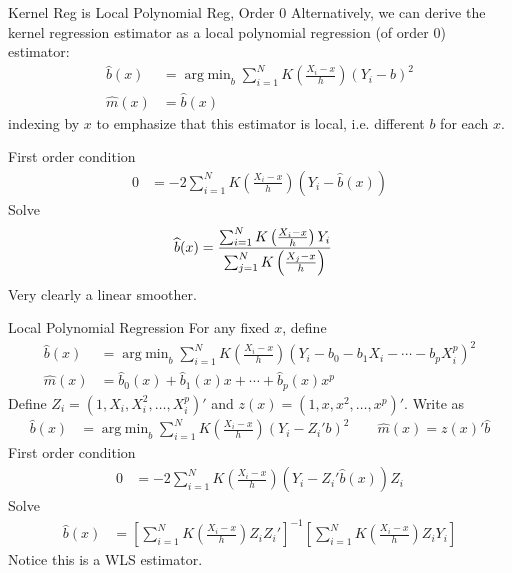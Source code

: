 \documentclass[aspectratio=169, handout]{beamer}
\DeclareMathOperator*{\argmin}{arg\;min}
\newcommand{\sumiN}{\sum^N_{i=1}}
\begin{document}
{\footnotesize
\begin{frame}{Kernel Reg is Local Polynomial Reg, Order 0}
Alternatively, we can derive the kernel regression estimator as a local
polynomial regression (of order 0) estimator:
\begin{align*}
  \widehat{b}(x)
  &=
  \argmin_b
  \sumiN
  K\left(
  \frac{X_i-x}{h}
  \right)
  (Y_i-b)^2
  \\
  \widehat{m}(x)
  &=
  \widehat{b}(x)
\end{align*}
indexing by $x$ to emphasize that this estimator is \alert{local}, i.e.
different $b$ for each $x$.

\pause
First order condition
\begin{align*}
  0
  &=
  -2
  \sumiN
  K\left(
  \frac{X_i-x}{h}
  \right)
  (Y_i-\widehat{b}(x))
\end{align*}
\pause
Solve
\begin{align*}
  \widehat{b}(x)
  &=
  \frac{%
    \sumiN
    K\left(
    \frac{X_i-x}{h}
    \right)
    Y_i
  }{%
    \sum_{j=1}^N
    K\left(
    \frac{X_j-x}{h}
    \right)
  }
\end{align*}
\pause
Very clearly a linear smoother.
\end{frame}
}


{\footnotesize
\begin{frame}{Local Polynomial Regression}
For any fixed $x$, define
\begin{align*}
  \widehat{b}(x)
  &=
  \argmin_b
  \sumiN
  K\left(
  \frac{X_i-x}{h}
  \right)
  (Y_i-b_0-b_1X_i-\cdots-b_pX_i^p)^2
  \\
  \widehat{m}(x)
  &=
  \widehat{b}_0(x)
  +
  \widehat{b}_1(x)
  x
  +
  \cdots+
  \widehat{b}_p(x)
  x^p
\end{align*}
\pause
Define $Z_i=(1,X_i,X_i^2,\ldots,X_i^p)'$
and $z(x) = (1,x,x^2,\ldots,x^p)'$.
Write as
\begin{align*}
  \widehat{b}(x)
  &=
  \argmin_b
  \sumiN
  K\left(
  \frac{X_i-x}{h}
  \right)
  (Y_i-Z_i'b)^2
  \qquad
  \widehat{m}(x)
  =
  z(x)'\widehat{b}
\end{align*}
\pause
First order condition
\begin{align*}
  0
  &=
  -2
  \sumiN
  K\left(
  \frac{X_i-x}{h}
  \right)
  (Y_i-Z_i'\widehat{b}(x))
  Z_i
\end{align*}
\pause
Solve
\begin{align*}
  \widehat{b}(x)
  &=
  \left[
  \sumiN
  K\left(
  \frac{X_i-x}{h}
  \right)
  Z_iZ_i'
  \right]^{-1}
  \left[
  \sumiN
  K\left(
  \frac{X_i-x}{h}
  \right)
  Z_iY_i
  \right]
\end{align*}
Notice this is a WLS estimator.
\end{frame}
}
\end{document}
